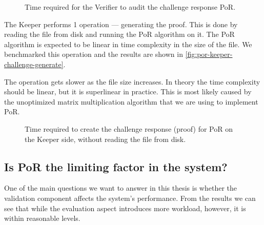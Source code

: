 \begin{figure}
  \myfloatalign
  \caption{Time required for the Verifier to audit the challenge response PoR.}
  \label{fig:por-verifier-audit-challenge}
\end{figure}

The Keeper performs 1 operation --- generating the proof.
This is done by reading the file from disk and running the PoR algorithm on it.
The PoR algorithm is expected to be linear in time complexity in the size of the file.
We benchmarked this operation and the results are shown in \autoref{fig:por-keeper-challenge-generate}.

The operation gets slower as the file size increases.
In theory the time complexity should be linear, but it is superlinear in practice.
This is most likely caused by the unoptimized matrix multiplication algorithm that we are using to
implement PoR.

\begin{figure}
  \myfloatalign
  \caption{Time required to create the challenge response (proof) for PoR on the Keeper side, without reading the file from disk.}
  \label{fig:por-keeper-challenge-generate}
\end{figure}

\subsection{Is PoR the limiting factor in the system?}

One of the main questions we want to answer in this thesis is whether the validation component
affects the system's performance.
From the results we can see that while the evaluation aspect introduces more workload,
however, it is within reasonable levels.

